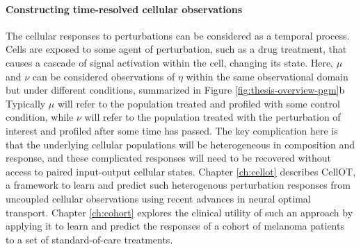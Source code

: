 \paragraph{Constructing time-resolved cellular observations}
The cellular responses to perturbations can be considered as a temporal process.
Cells are exposed to some agent of perturbation, such as a drug treatment, that causes a cascade of signal activation within the cell, changing its state.
Here, $\mu$ and $\nu$ can be considered observations of $\eta$ within the same observational domain but under different conditions, summarized in Figure \ref{fig:thesis-overview-pgm}b
Typically $\mu$ will refer to the population treated and profiled with some control condition, while $\nu$ will refer to the population treated with the perturbation of interest and profiled after some time has passed.
The key complication here is that the underlying cellular populations will be heterogeneous in composition and response, and these complicated responses will need to be recovered without access to paired input-output cellular states.
Chapter \ref{ch:cellot} describes CellOT, a framework to learn and predict such heterogenous perturbation responses from uncoupled cellular observations using recent advances in neural optimal transport.
Chapter \ref{ch:cohort} explores the clinical utility of such an approach by applying it to learn and predict the responses of a cohort of melanoma patients to a set of standard-of-care treatments.
